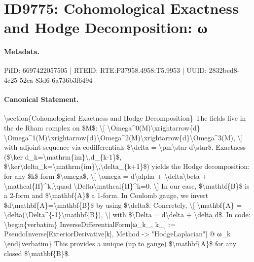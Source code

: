 \section*{ID9775: Cohomological Exactness and Hodge Decomposition: ω}
\paragraph{Metadata.}
PiID: 6697422057505 | RTEID: RTE:P37958.4958:T5.9953 | UUID: 2832bed8-4c25-52ea-83d6-6a736b3f6494

\paragraph{Canonical Statement.}
\textbackslash{}section\{Cohomological Exactness and Hodge Decomposition\} The fields live in the de Rham complex on \$M\$: \textbackslash{}[ \textbackslash{}Omega\textasciicircum{}0(M)\textbackslash{}xrightarrow\{d\} \textbackslash{}Omega\textasciicircum{}1(M)\textbackslash{}xrightarrow\{d\}\textbackslash{}Omega\textasciicircum{}2(M)\textbackslash{}xrightarrow\{d\}\textbackslash{}Omega\textasciicircum{}3(M), \textbackslash{}] with adjoint sequence via codifferentials \$\textbackslash{}delta = \textbackslash{}pm\textbackslash{}star d\textbackslash{}star\$. Exactness (\$\textbackslash{}ker d\_k=\textbackslash{}mathrm\{im\}\textbackslash{},d\_\{k-1\}\$, \$\textbackslash{}ker\textbackslash{}delta\_k=\textbackslash{}mathrm\{im\}\textbackslash{},\textbackslash{}delta\_\{k+1\}\$) yields the Hodge decomposition: for any \$k\$-form \$\textbackslash{}omega\$, \textbackslash{}[ \textbackslash{}omega = d\textbackslash{}alpha + \textbackslash{}delta\textbackslash{}beta + \textbackslash{}mathcal\{H\}\textasciicircum{}k,\textbackslash{}quad \textbackslash{}Delta\textbackslash{}mathcal\{H\}\textasciicircum{}k=0. \textbackslash{}] In our case, \$\textbackslash{}mathbf\{B\}\$ is a 2-form and \$\textbackslash{}mathbf\{A\}\$ a 1-form. In Coulomb gauge, we invert \$d\textbackslash{}mathbf\{A\}=\textbackslash{}mathbf\{B\}\$ by using \$\textbackslash{}delta\$. Concretely, \textbackslash{}[ \textbackslash{}mathbf\{A\} = \textbackslash{}delta(\textbackslash{}Delta\textasciicircum{}\{-1\}\textbackslash{}mathbf\{B\}), \textbackslash{}] with \$\textbackslash{}Delta = d\textbackslash{}delta + \textbackslash{}delta d\$. In code: \textbackslash{}begin\{verbatim\} InverseDifferentialForm[ω\_k\_, k\_] := PseudoInverse[ExteriorDerivative[k], Method -> "HodgeLaplacian"] @ ω\_k \textbackslash{}end\{verbatim\} This provides a unique (up to gauge) \$\textbackslash{}mathbf\{A\}\$ for any closed \$\textbackslash{}mathbf\{B\}\$.

